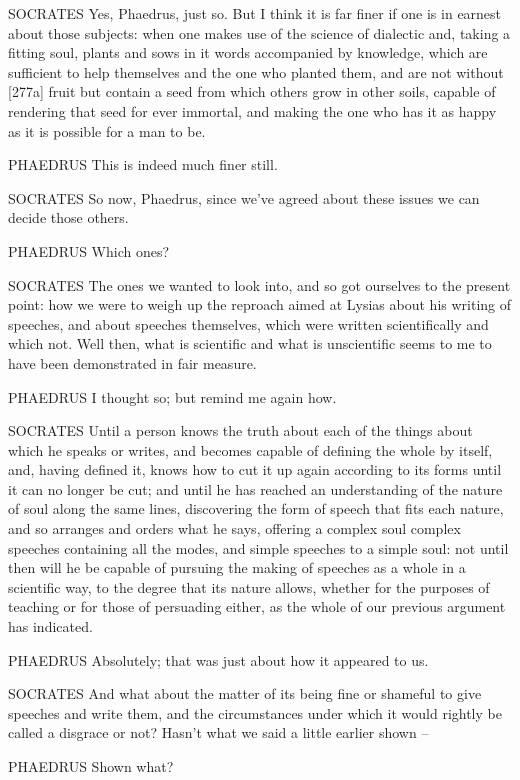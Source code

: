 SOCRATES Yes, Phaedrus, just so. But I think it is far finer if one
 is in earnest about those subjects: when one makes use of the
science of dialectic and, taking a fitting soul, plants and sows in it
words accompanied by knowledge, which are sufficient to help themselves
and the one who planted them, and are not without {[}277a{]} fruit but
contain a seed from which others grow in other soils, capable of
rendering that seed for ever immortal, and making the one who has it as
happy as it is possible for a man to be.

PHAEDRUS This is indeed much finer still. 

SOCRATES So now, Phaedrus, since we've agreed about these issues we can
decide those others.

PHAEDRUS Which ones?

SOCRATES The ones we wanted to look into, and so got ourselves to the
present point: how we were to weigh up the reproach aimed  at
Lysias about his writing of speeches, and about speeches themselves,
 which were written scientifically and which not. Well then,
what is scientific and what is unscientific seems to me to have been
demonstrated in fair measure.

PHAEDRUS I thought so; but remind me again how.

SOCRATES Until a person knows the truth about each of the 
things about which he speaks or writes, and becomes capable of defining
the whole by itself, and, having defined it, knows how to cut it up
again according to its forms until it can no longer be cut; and until he
has reached an understanding of the nature of soul along the same lines,
discovering the form of  speech that fits each nature, and so
arranges and orders what he says, offering a
complex soul complex
speeches containing all the modes, and simple speeches to a simple soul:
not until then will he be capable of pursuing the making of speeches as
a whole in a scientific way, to the degree that its nature allows,
 whether for the purposes of teaching or for those of persuading
either, as the whole of our previous argument has indicated.

PHAEDRUS Absolutely; that was just about how it appeared to us.

SOCRATES And what about the matter of its being fine or 
shameful to give speeches and write them, and the circumstances under
which it would rightly be called a disgrace or not? Hasn't what we said
a little earlier shown --

 PHAEDRUS Shown what?

